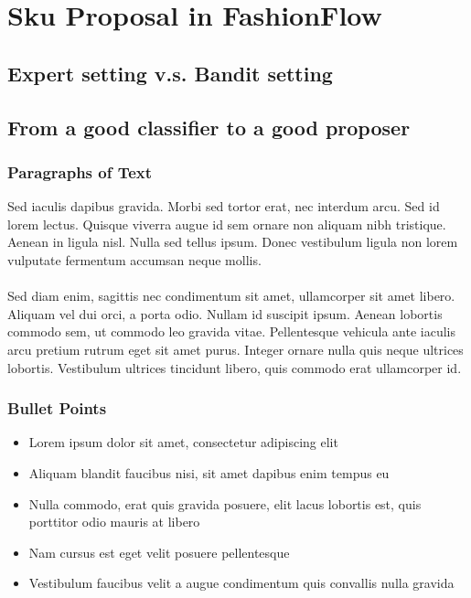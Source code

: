 \documentclass{beamer}
\begin{document}
\section{Sku Proposal in FashionFlow}
\subsection{Expert setting v.s. Bandit setting}
\subsection{From a good classifier to a good proposer}


\begin{frame}
\frametitle{Paragraphs of Text}
Sed iaculis dapibus gravida. Morbi sed tortor erat, nec interdum arcu. Sed id lorem lectus. Quisque viverra augue id sem ornare non aliquam nibh tristique. Aenean in ligula nisl. Nulla sed tellus ipsum. Donec vestibulum ligula non lorem vulputate fermentum accumsan neque mollis.\\~\\

Sed diam enim, sagittis nec condimentum sit amet, ullamcorper sit amet libero. Aliquam vel dui orci, a porta odio. Nullam id suscipit ipsum. Aenean lobortis commodo sem, ut commodo leo gravida vitae. Pellentesque vehicula ante iaculis arcu pretium rutrum eget sit amet purus. Integer ornare nulla quis neque ultrices lobortis. Vestibulum ultrices tincidunt libero, quis commodo erat ullamcorper id.
\end{frame}


\begin{frame}
\frametitle{Bullet Points}
\begin{itemize}
\item Lorem ipsum dolor sit amet, consectetur adipiscing elit
\item Aliquam blandit faucibus nisi, sit amet dapibus enim tempus eu
\item Nulla commodo, erat quis gravida posuere, elit lacus lobortis est, quis porttitor odio mauris at libero
\item Nam cursus est eget velit posuere pellentesque
\item Vestibulum faucibus velit a augue condimentum quis convallis nulla gravida
\end{itemize}
\end{frame}
\end{document}
